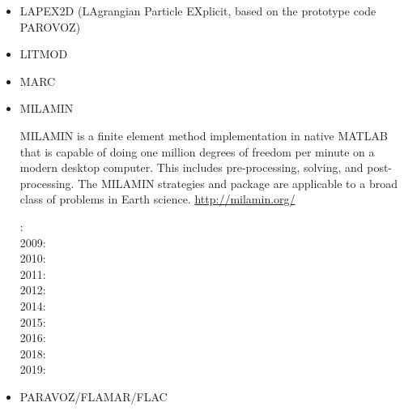 \begin{itemize}
\item LAPEX2D (LAgrangian Particle EXplicit, based on the prototype code PAROVOZ) 
\cite{sopg05}
\cite{bbeg06}\cite{basv06}
\cite{baso08}
\cite{scbe08}
\cite{sosk11}


\item LITMOD
\cite{afrf07}
\cite{affr08}
\cite{fuac09}
\cite{fufa10}


\item MARC
\cite{nesg97}
\cite{nesb99}


\item MILAMIN 

MILAMIN is a finite element method implementation in native MATLAB that is capable of doing one million degrees of freedom per minute on a modern desktop computer. This includes pre-processing, solving, and post-processing. The MILAMIN strategies and package are applicable to a broad class of problems in Earth science. \url{http://milamin.org/}

: \cite{daks08}\\
2009: \cite{gogk09}\\
2010: \cite{krda10}\cite{kaus10}\\
2011: \cite{yakm11}\\
2012: \cite{gebk12}\\
2014: \cite{jobk14}\\
2015: \cite{lukz15}\cite{gehm15}\cite{thkp15}\cite{musd15}\\
2016: \cite{jads16}\cite{maka16}\\
2018: \cite{dusd18}\cite{jasc18}\cite{jadg18}\cite{comj18}\cite{jens18}\cite{rabw18}\cite{chsm18}\\
2019: \cite{anpa19}\cite{sifg19}\cite{baba19}


\item PARAVOZ/FLAMAR/FLAC   


\end{itemize}
